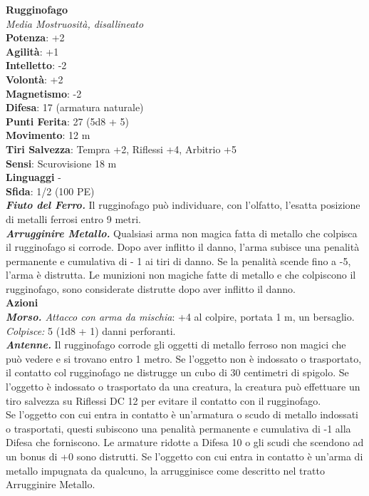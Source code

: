 \begin{multicols}{2}
\medskip\textbf{Rugginofago}\\
\emph{Media Mostruosità, disallineato}\\
\textbf{Potenza}: +2\\
\textbf{Agilità}: +1\\
\textbf{Intelletto}: -2\\
\textbf{Volontà}: +2\\
\textbf{Magnetismo}: -2\\
\textbf{Difesa}: 17 (armatura naturale)\\
\textbf{Punti Ferita}: 27 (5d8 + 5)\\
\textbf{Movimento}: 12 m\\
\textbf{Tiri Salvezza}: Tempra +2, Riflessi +4, Arbitrio +5\\
\textbf{Sensi}: Scurovisione 18 m\\
\textbf{Linguaggi} -\\
\textbf{Sfida}: 1/2 (100 PE)\smallskip\\
\emph{\textbf{Fiuto del Ferro.}} Il rugginofago può individuare, con l'olfatto, l'esatta posizione di metalli ferrosi entro 9 metri.\\
\emph{\textbf{Arrugginire Metallo.}} Qualsiasi arma non magica fatta di metallo che colpisca il rugginofago si corrode. Dopo aver inflitto il danno, l'arma subisce una penalità permanente e cumulativa di - 1 ai tiri di danno. Se la penalità scende fino a -5, l'arma è distrutta. Le munizioni non magiche fatte di metallo e che colpiscono il rugginofago, sono considerate distrutte dopo aver inflitto il danno. \\
\smallskip\textbf{Azioni}\\
\emph{\textbf{Morso.} Attacco con arma da mischia}: +4 al colpire, portata 1 m, un bersaglio.
\emph{Colpisce:} 5 (1d8 + 1) danni perforanti.\\
\emph{\textbf{Antenne.}} Il rugginofago corrode gli oggetti di metallo ferroso non magici che può vedere e si trovano entro 1 metro. Se l'oggetto non è indossato o trasportato, il contatto col rugginofago ne distrugge un cubo di 30 centimetri di spigolo. Se l'oggetto è indossato o trasportato da una creatura, la creatura può effettuare un tiro salvezza su Riflessi DC  12 per evitare il contatto con il rugginofago. \\
Se l'oggetto con cui entra in contatto è un'armatura o scudo di metallo indossati o trasportati, questi subiscono una penalità permanente e cumulativa di -1 alla Difesa che forniscono. Le armature ridotte a Difesa 10 o gli scudi che scendono ad un bonus di +0 sono distrutti. Se l'oggetto con cui entra in contatto è un'arma di metallo impugnata da qualcuno, la arrugginisce come descritto nel tratto Arrugginire Metallo. 

\end{multicols}
